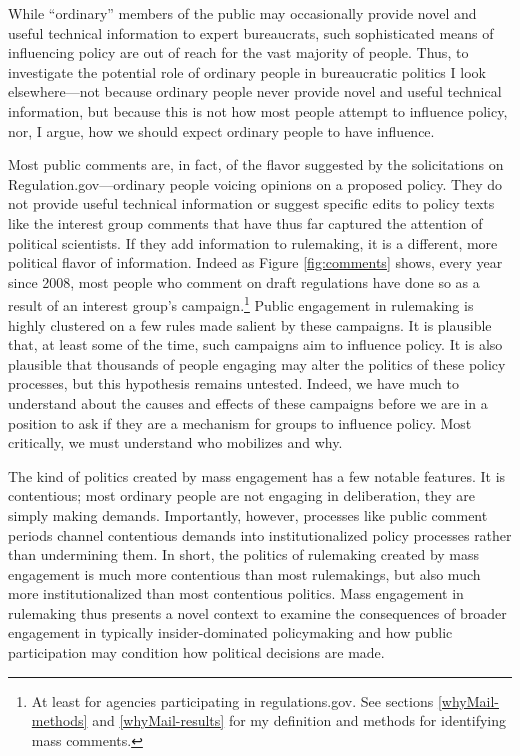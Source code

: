 %  

While ``ordinary'' members of the public may occasionally provide novel and useful technical information to expert bureaucrats, such sophisticated means of influencing policy are out of reach for the vast majority of people. Thus, to investigate the potential role of ordinary people in bureaucratic politics I look elsewhere---not because ordinary people never provide novel and useful technical information, but because this is not how most people attempt to influence policy, nor, I argue, how we should expect ordinary people to have influence.

Most public comments are, in fact, of the flavor suggested by the solicitations on Regulation.gov---ordinary people voicing opinions on a proposed policy. They do not provide useful technical information or suggest specific edits to policy texts like the interest group comments that have thus far captured the attention of political scientists. If they add information to rulemaking, it is a different, more political flavor of information.  Indeed as Figure \ref{fig:comments} shows, every year since 2008, most people who comment on draft regulations have done so as a result of an interest group's campaign.\footnote{At least for agencies participating in regulations.gov. See sections \ref{whyMail-methods} and \ref{whyMail-results} for my definition and methods for identifying mass comments.} 
Public engagement in rulemaking is highly clustered on a few rules made salient by these campaigns. It is plausible that, at least some of the time, such campaigns aim to influence policy. It is also plausible that thousands of people engaging may alter the politics of these policy processes, but this hypothesis remains untested. Indeed, we have much to understand about the causes and effects of these campaigns before we are in a position to ask if they are a mechanism for %
groups to influence policy. Most critically, we must understand who mobilizes and why.

The kind of politics created by mass engagement has a few notable features. It is contentious; most ordinary people are not engaging in deliberation, they are simply making demands. Importantly, however, processes like public comment periods channel contentious demands into institutionalized policy processes rather than undermining them. %
In short, the politics of rulemaking created by mass engagement is much more contentious than most rulemakings, but also much more institutionalized than most contentious politics. Mass engagement in rulemaking thus presents a novel context to examine the consequences of broader engagement in typically insider-dominated policymaking and how public participation may condition how political decisions are made. 

